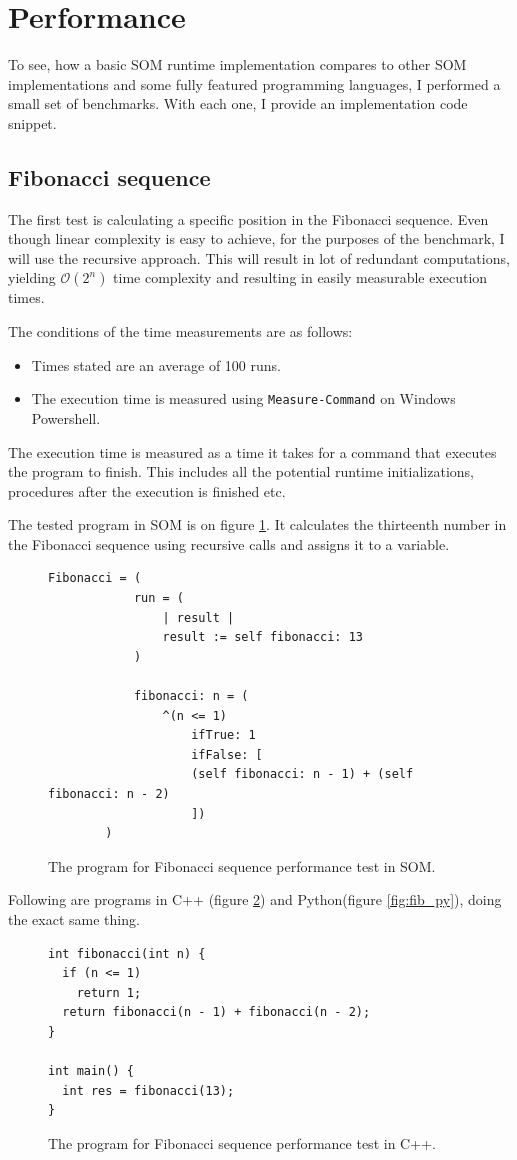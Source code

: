 \documentclass[thesis=M,english]{FITthesis}[2019/12/23]
\begin{document}
\section{Performance}
To see, how a basic SOM runtime implementation compares to other SOM implementations and some fully featured programming languages, I performed
a small set of benchmarks. With each one, I provide an implementation code snippet.

\subsection{Fibonacci sequence}
The first test is calculating a specific position in the Fibonacci sequence. Even though linear complexity is easy to achieve, for the purposes
of the benchmark, I will use the recursive approach. This will result in lot of redundant computations, yielding $\mathcal{O}(2 ^ n)$
time complexity and resulting in easily measurable execution times.

The conditions of the time measurements are as follows:
\begin{itemize}
	\item Times stated are an average of 100 runs.
	\item The execution time is measured using \texttt{Measure-Command} on Windows Powershell.
\end{itemize}

The execution time is measured as a time it takes for a command that executes the program to finish. This includes all the potential
runtime initializations, procedures after the execution is finished etc.  

The tested program in SOM is on figure \ref{fig:fib_som}. It calculates the thirteenth number in the Fibonacci sequence using recursive calls and
assigns it to a variable.
\begin{figure}
	\centering
	\begin{lstlisting}[language=Smalltalk]
		Fibonacci = (
			run = (
				| result |
				result := self fibonacci: 13
			)

			fibonacci: n = (
				^(n <= 1)
					ifTrue: 1
					ifFalse: [ 
					(self fibonacci: n - 1) + (self fibonacci: n - 2)
					])
		)
	\end{lstlisting}
	\caption{The program for Fibonacci sequence performance test in SOM.}
	\label{fig:fib_som}
\end{figure}

Following are programs in C++ (figure \ref{fig:fib_cpp}) and Python(figure \ref{fig:fib_py}), doing the exact same thing.
\begin{figure}
	\centering
	\begin{verbatim}
int fibonacci(int n) {
  if (n <= 1)
    return 1;
  return fibonacci(n - 1) + fibonacci(n - 2);
}

int main() {
  int res = fibonacci(13);
}
	\end{verbatim}
	\caption{The program for Fibonacci sequence performance test in C++.}
	\label{fig:fib_cpp}
\end{figure}
\end{document}
